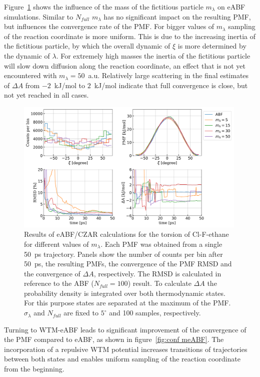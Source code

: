 Figure~\ref{fig:conf eABF m} shows the influence of the mass of the fictitious particle $m_\lambda$ on eABF simulations.
Similar to $N_{full}$ $m_\lambda$ has no significant impact on the resulting PMF, but influences the convergence rate of the PMF.
For bigger values of $m_\lambda$ sampling of the reaction coordinate is more uniform.
This is due to the increasing inertia of the fictitious particle, by which the overall dynamic of $\xi$ is more determined by the dynamic of $\lambda$.
For extremely high masses the inertia of the fictitious particle will slow down diffusion along the reaction coordinate, an effect that is not yet encountered with $m_\lambda=50$~a.u.
Relatively large scattering in the final estimates of $\Delta A$ from $-2$~kJ/mol to $2$~kJ/mol indicate that full convergence is close, but not yet reached in all cases.
\begin{figure}[H]
  \centering
    \includegraphics[width=0.99\textwidth]{bilder/benchmark/eABF_benchmark_mass}
   \caption{
     Results of eABF/CZAR calculations for the torsion of Cl-F-ethane for different values of $m_{\lambda}$. Each PMF was obtained from a single 50~ps trajectory. Panels show the number of counts per bin after 50~ps, the resulting PMFs, the convergence of the PMF RMSD and the convergence of $\Delta A$, respectively. The RMSD is calculated in reference to the ABF ($N_{full}=100$) result. To calculate $\Delta A$ the probability density is integrated over both thermodynamic states. For this purpose states are separated at the maximum of the PMF. $\sigma_\lambda$ and $N_{full}$ are fixed to $5^\circ$ and 100 samples, respectively.
   }
   \label{fig:conf eABF m}
\end{figure}
Turning to WTM-eABF leads to significant improvement of the convergence of the PMF compared to eABF, as shown in figure~\ref{fig:conf meABF}.
The incorporation of a repulsive WTM potential increases transitions of trajectories between both states and enables uniform sampling of the reaction coordinate from the beginning.
